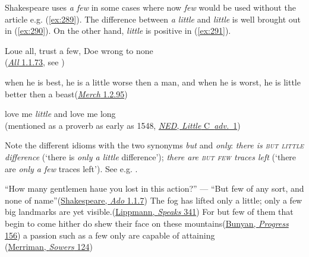 Shakespeare uses \textit{a few} in some cases %
where now \textit{few} would be used without the article e.g. (\ref{ex:289}). The difference between \textit{a little} and \textit{little} is well brought out in (\ref{ex:290}). On the other hand, \textit{little} is positive in (\ref{ex:291}).

\ea \label{ex:289}
Loue all, trust a few, Doe wrong to none\\\hfill(\href{https://internetshakespeare.uvic.ca/doc/AWW_F1/index.html#tln-65}{\textit{All} 1.1.73}, see \citet[\href{https://www.perseus.tufts.edu/hopper/text\%3Fdoc\%3DPerseus\%3Atext\%3A1999.03.0079\%3Aalphabetic\%2Bletter\%3DF\%3Aentry\%2Bgroup\%3D7\%3Aentry\%3DFew}{\textit{Few}}]{schmidt1886}) %

\ex when he is best, he is a little worse then a man, and when he is worst, he is little better then a beast\hfill(\href{https://internetshakespeare.uvic.ca/doc/MV_F1/scene/1.2/index.html#tln-275}{\textit{Merch} 1.2.95})\label{ex:290} %

\ex love me \textit{little} and love me long\\\hfill{(mentioned as a proverb as early as 1548, \href{https://archive.org/details/oed6aarch/page/n365/mode/2up?view=theater}{\textit{NED}, \textit{Little} C~\textit{adv.}~1})}\label{ex:291}
\z

Note the different idioms with the two synonyms \textit{but} and \textit{only}: \textit{there is \textsc{but little} difference} (`there is \emph{only a little} difference'); \textit{there are \textsc{but few} traces left} (`there are \emph{only a few} traces left'). See e.g. . 

\ea\label{ex:292}
\ea
``How many gentlemen haue you lost in this action?'' --- ``But few of any sort, and none of name''\hfill(\href{https://internetshakespeare.uvic.ca/doc/Ado_F1/index.html#tln-5}{Shakespeare, \textit{Ado} 1.1.7}) %
\ex\label{ex:293}
The fog has lifted only a little; only a few big landmarks are yet visible.\hfill(\href{https://archive.org/details/sim_new-republic_1917-01-27_9_117/page/340/mode/2up?q=\%22fog+has+lifted\%22&view=theater}{Lippmann, \textit{Speaks} 341})
\ex\label{ex:294}
For but few of them that begin to come hither do shew their face on these mountains\hfill(\href{https://archive.org/details/bunyanspilgrims00moffgoog/page/158/mode/2up?view=theater&q=\%22shew+their+face%22}{Bunyan, \textit{Progress} 156})
\ex\label{ex:295}
a passion such as a few only are capable of attaining\\\hfill(\href{https://archive.org/details/sowersnovel00merr/page/196/mode/2up?q=\%22passion+such+as\%22&view=theater}{Merriman, \textit{Sowers} 124})
\z
\z

